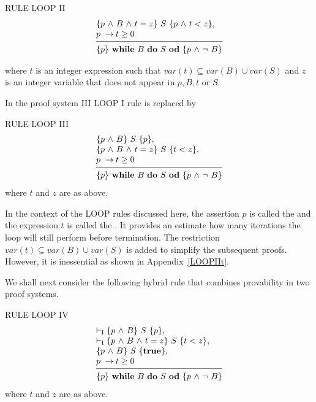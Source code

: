 \documentclass[runningheads]{llncs}       %
\begin{document}
\NI
RULE LOOP II
\[
 \begin{array}{l}
  \HT{p \A B \A t=z}{S}{p \A t<z},          \\
  p\ \ra t \geq 0                           \\
  [-\medskipamount]
  \hrulefill                                \\
  \HT{p}{\WDD{B}{S}}{p \A \neg\ B}
 \end{array}
\]

\NI
where $t$ is an integer expression such that  $var(t) \subseteq var(B) \cup  var(S)$
and $z$ is an integer variable that
does not appear in $p,B,t$ or $S$.

\III

In the proof system III  LOOP I rule is replaced by
\III

\NI
RULE \label{rul:loop2} LOOP III
\[
 \begin{array}{l}
  \HT{p \A B}{S}{p},                      \\
  \HT{p \A B \A t=z}{S}{t<z},             \\
  p\ \ra t \geq 0                         \\
  [-\medskipamount]
  \hrulefill                              \\
  \HT{p}{\WDD{B}{S}}{p \A \neg\ B}
 \end{array}
\]
%
\NI
where $t$ and $z$ are as above.

\III

In the context of the LOOP rules discussed here, 
the assertion $p$ is called the  and the expression $t$
is called the . It provides an estimate how
many iterations the loop will still perform before termination.
The restriction  $var(t) \subseteq var(B) \cup var(S)$ is added to simplify the subsequent proofs.
However, it is inessential as shown in Appendix~\ref{LOOPIIt}.



We shall next consider the following hybrid rule that combines provability in two
proof systems.
\III

\NI
RULE LOOP IV
\[
 \begin{array}{l}
  \vdash_{\rm{I}}  \HT{p \A B}{S}{p},             \\
  \vdash_{\rm{I}}   \HT{p \A B \A t=z}{S}{t<z},   \\
  \HT{p \A B}{S}{\mathbf{true}},                  \\
  p\ \ra t \geq 0                                 \\
  [-\medskipamount]
  \hrulefill                                      \\
  \HT{p}{\WDD{B}{S}}{p \A \neg\ B}
 \end{array}
\]
%
\NI
where $t$ and $z$ are as above.
\III
\end{document}
